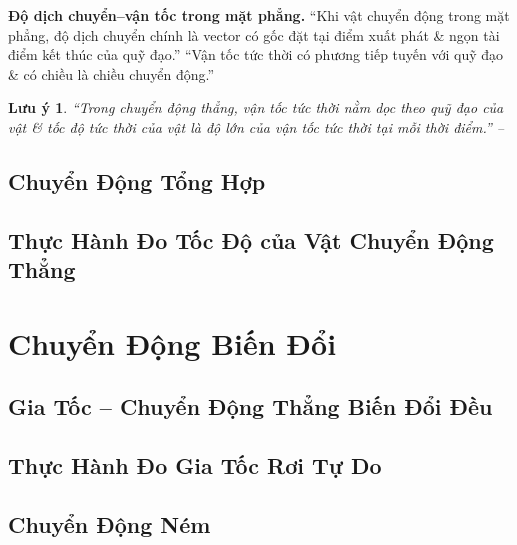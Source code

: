 \documentclass[oneside]{book}
\numberwithin{equation}{section}
\newtheorem{luuy}{Lưu ý}[section]
\begin{document}
\textbf{Độ dịch chuyển--vận tốc trong mặt phẳng.} ``Khi vật chuyển động trong mặt phẳng, độ dịch chuyển chính là vector có gốc đặt tại điểm xuất phát \& ngọn tài điểm kết thúc của quỹ đạo.'' ``Vận tốc tức thời có phương tiếp tuyến với quỹ đạo \& có chiều là chiều chuyển động.''

\begin{luuy}
	``Trong chuyển động thẳng, vận tốc tức thời nằm dọc theo quỹ đạo của vật \& tốc độ tức thời của vật là độ lớn của vận tốc tức thời tại mỗi thời điểm.'' -- \cite[p. 30]{SGK_Vat_Ly_10_Chan_Troi_Sang_Tao}
\end{luuy}


\section{Chuyển Động Tổng Hợp}


\section{Thực Hành Đo Tốc Độ của Vật Chuyển Động Thẳng}


\chapter{Chuyển Động Biến Đổi}

\section{Gia Tốc -- Chuyển Động Thẳng Biến Đổi Đều}


\section{Thực Hành Đo Gia Tốc Rơi Tự Do}


\section{Chuyển Động Ném}
\end{document}

